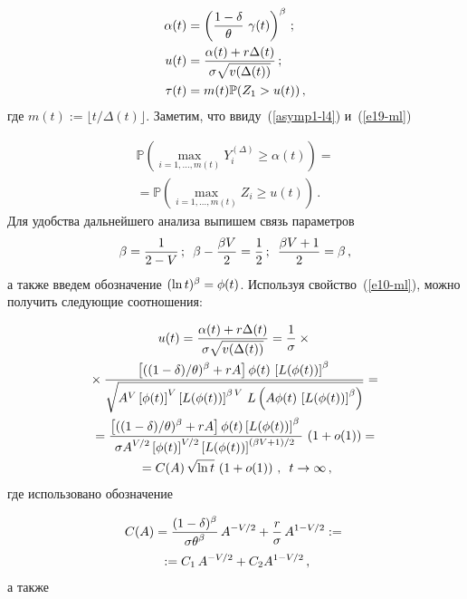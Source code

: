 \begin{multicols}{2}
\vspace*{-2pt}

\noindent
\begin{align*}
\alpha(t)&=\left( \displaystyle\frac{\displaystyle 1-\delta\mathstrut}{\displaystyle \theta\mathstrut}\,\,\gamma (t) \right)^\beta\,;\\
u(t)&= \displaystyle\frac{\displaystyle  \alpha(t)+r\Delta(t)\mathstrut}{\displaystyle \sigma\sqrt{v(\Delta(t))}\mathstrut}\,;\\
\tau(t)&= m(t)\mathbb{P}(Z_1>u(t))\,,
\end{align*}
где $m(t):=\lfloor t/\Delta(t)\rfloor$. Заметим, что ввиду~(\ref{asymp1-l4}) и~(\ref{e19-ml})

\vspace*{-2pt}

\noindent
\begin{multline}
\mathbb{P} \left( \max\limits_{i=1,\ldots, m(t)} Y_i^{(\Delta)} \geq \alpha(t)
\right) = {}\\
{}=\mathbb{P} \left( \max\limits_{i=1,\ldots ,m(t)} Z_i \geq u(t)
\right)\,.
\label{e27-ml}
\end{multline}
Для удобства дальнейшего анализа выпишем связь параметров
\begin{equation*}
\beta=\displaystyle\frac{\displaystyle 1\mathstrut}{\displaystyle 2-V\mathstrut}\,;\enskip \beta-\displaystyle\frac{\displaystyle \beta V\mathstrut}{\displaystyle 2\mathstrut}=\displaystyle\frac{\displaystyle 1\mathstrut}{\displaystyle 2\mathstrut}\,;\enskip
\displaystyle\frac{\displaystyle \beta V +1\mathstrut}{\displaystyle 2\mathstrut}=\beta\,,
\end{equation*}
а также введем обозначение  $(\ln t)^\beta\hm=\phi(t)$.
 Используя свойство~(\ref{e10-ml}), можно получить следующие соотношения:
 
 \noindent
\begin{multline*}
u(t) =  \displaystyle\frac{\displaystyle  \alpha(t)+r\Delta(t) \mathstrut}{\displaystyle \sigma\sqrt{v(\Delta(t))}\mathstrut}=\displaystyle\frac{\displaystyle 1\mathstrut}{\displaystyle \sigma\mathstrut}\times{}\\
{}\times\displaystyle\frac{\displaystyle \left[((1-\delta)/\theta)^\beta+rA\right] \phi(t)\,
\left[L(  \phi(t))\right]^\beta\mathstrut}{\displaystyle \sqrt{ A^V \left[\phi(t)\right]^ V \left[L ( \phi(t)
)\right]^{\beta \,V}\,L\left( A \phi(t)\,\left[L(
\phi(t))\right]^\beta\right )}\mathstrut}={}\\
{}= \displaystyle\frac{\displaystyle \left[((1-\delta)/\theta)^\beta+rA\right]
\phi(t) \left[L(\phi(t))\right]^\beta\mathstrut}{\displaystyle \sigma A^{{V}/{2}}
\left[\phi(t)\right]^{{V}/{2}}\left[L(\phi(t))\right]^{(\beta V+1)/2}\mathstrut}\,
\left(1+o(1)\right)={}\\
{}=C(A)\,\sqrt{\ln t}\,\left(1+o(1)\right)\,,\enskip t \to \infty\,,
\end{multline*}
где использовано обозначение

\noindent
\begin{multline*}
C(A)=\displaystyle\frac{\displaystyle (1-\delta)^\beta\mathstrut}{\displaystyle \sigma\theta^\beta\mathstrut}\,
A^{-{V}/{2}}+\displaystyle\frac{\displaystyle r\mathstrut}{\displaystyle \sigma\mathstrut}\,A^{1-{V}/{2}}:={}\\
{}:=C_1\,A^{-{V}/{2}}+C_2 A^{1-{V}/{2}}\,,
\end{multline*}
а также


\end{multicols}
